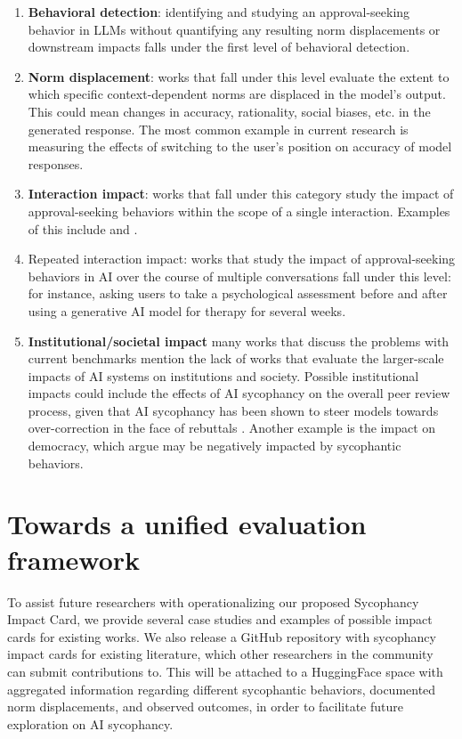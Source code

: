 \begin{enumerate}
    \item \textbf{Behavioral detection}: identifying and studying an approval-seeking behavior in LLMs without quantifying any resulting norm displacements or downstream impacts falls under the first level of behavioral detection. 
    \item \textbf{Norm displacement}: works that fall under this level evaluate the extent to which specific context-dependent norms are displaced in the model's output. This could mean changes in accuracy, rationality, social biases, etc. in the generated response. The most common example in current research is measuring the effects of switching to the user's position on accuracy of model responses.
    \item \textbf{Interaction impact}: works that fall under this category study the impact of approval-seeking behaviors within the scope of a single interaction. Examples of this include \citet{cheng2026sycophantic} and \citet{rathje2025sycophantic}.
    \item {Repeated interaction impact}: works that study the impact of approval-seeking behaviors in AI over the course of multiple conversations fall under this level: for instance, asking users to take a psychological assessment before and after using a generative AI model for therapy for several weeks.
    \item \textbf{Institutional/societal impact} many works that discuss the problems with current benchmarks mention the lack of works that evaluate the larger-scale impacts of AI systems on institutions and society. Possible institutional impacts could include the effects of AI sycophancy on the overall peer review process, given that AI sycophancy has been shown to steer models towards over-correction in the face of rebuttals \cite{wang2026ai}. Another example is the impact on democracy, which \citet{turner2026programmed} argue may be negatively impacted by sycophantic behaviors.
\end{enumerate} 

\section{Towards a unified evaluation framework}

To assist future researchers with operationalizing our proposed Sycophancy Impact Card, we provide several case studies and examples of possible impact cards for existing works. We also release a GitHub repository with sycophancy impact cards for existing literature, which other researchers in the community can submit contributions to. This will be attached to a HuggingFace space with aggregated information regarding different sycophantic behaviors, documented norm displacements, and observed outcomes, in order to facilitate future exploration on AI sycophancy.

